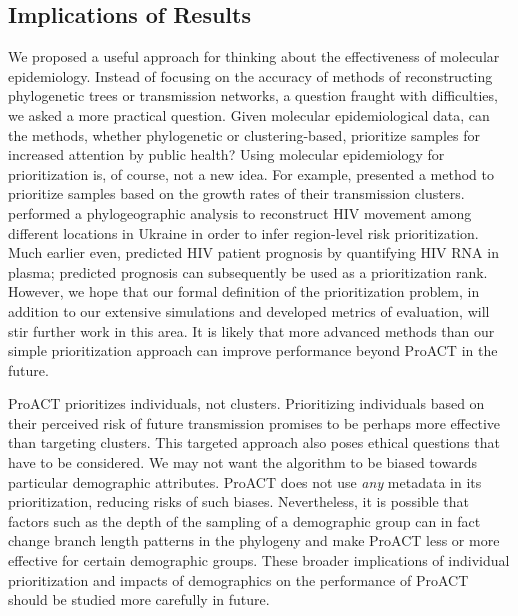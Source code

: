 \documentclass[a4paper,11pt]{article}
\newcommand{\authorcite}[1]{\citeauthor{#1}\supercite{#1}}
\newcommand{\PLWH}{sample\xspace}
\begin{document}
\subsection{Implications of Results}

We proposed a useful approach for thinking about the effectiveness of molecular epidemiology. 
Instead of focusing on the accuracy of methods of reconstructing phylogenetic trees or transmission networks, a question fraught with difficulties, we asked a more practical question. 
Given molecular epidemiological data, can the methods, whether phylogenetic or clustering-based, prioritize \PLWH{s} for increased attention by public health?
Using molecular epidemiology for prioritization is, of course, not a new idea. For example, \authorcite{Wertheim2018} presented a method to prioritize \PLWH{s} based on the growth rates of their transmission clusters.
\authorcite{Vasylyeva2018} performed a phylogeographic analysis to reconstruct HIV movement among different locations in Ukraine in order to infer region-level risk prioritization.
Much earlier even, \authorcite{Mellors1996} predicted HIV patient prognosis by quantifying HIV RNA in plasma; predicted prognosis can subsequently be used as a prioritization rank.
However, we hope that our formal definition of the  prioritization problem, in addition to our extensive simulations and developed metrics of evaluation, will stir further work in this area. 
It is likely that more advanced methods than our simple prioritization approach can improve performance beyond ProACT in the future. 



ProACT prioritizes individuals, not clusters.
Prioritizing %
individuals based on their perceived risk of future transmission promises to be perhaps more effective than targeting clusters.
This targeted approach also poses ethical questions that 
have to be considered. 
We may not want the algorithm to be biased towards particular demographic attributes. 
ProACT does not use {\em any} metadata in its prioritization, reducing risks of such biases. 
Nevertheless, it is possible that factors such as the depth of the sampling of a demographic group can in fact change branch length patterns in the phylogeny and make ProACT less or more effective for certain demographic groups. 
These broader implications of individual prioritization and impacts of demographics on the performance of ProACT should be studied more carefully in future. 
\end{document}
